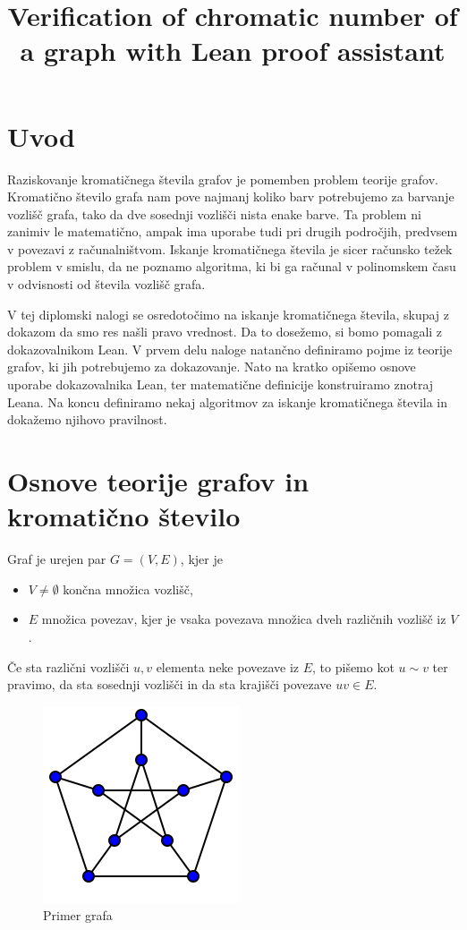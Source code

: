 \documentclass[mat1]{fmfdelo}
\title{Verification of chromatic number of a graph with Lean proof assistant}
\begin{document}
\section{Uvod}
Raziskovanje kromatičnega števila grafov je pomemben problem teorije grafov.
Kromatično število grafa nam pove najmanj koliko barv potrebujemo za barvanje vozlišč grafa, tako da dve sosednji vozlišči nista enake barve.
Ta problem ni zanimiv le matematično, ampak ima uporabe tudi pri drugih področjih, predvsem v povezavi z računalništvom. 
Iskanje kromatičnega števila je sicer računsko težek problem v smislu, da ne poznamo algoritma, ki bi ga računal v polinomskem času v odvisnosti od števila vozlišč grafa.

V tej diplomski nalogi se osredotočimo na iskanje kromatičnega števila, skupaj z dokazom da smo res našli pravo vrednost.
Da to dosežemo, si bomo pomagali z dokazovalnikom Lean.
V prvem delu naloge natančno definiramo pojme iz teorije grafov, ki jih potrebujemo za dokazovanje. Nato na kratko opišemo osnove uporabe dokazovalnika
Lean, ter matematične definicije konstruiramo znotraj Leana. 
Na koncu definiramo nekaj algoritmov za iskanje kromatičnega števila in dokažemo njihovo pravilnost. 


\section{Osnove teorije grafov in kromatično število}

\begin{definicija}
    Graf je urejen par $G=(V, E)$, kjer je 
    \begin{itemize}
      \item $V\neq \emptyset$ končna množica vozlišč,
      \item $E$ množica povezav, kjer je vsaka povezava množica dveh različnih vozlišč iz $V$. 
    \end{itemize}
\end{definicija}
Če sta različni vozlišči $u, v$ elementa neke povezave iz $E$, to pišemo kot $u\sim v$ ter pravimo, da sta sosednji vozlišči in da sta krajišči povezave $uv\in E$.

\begin{figure}[H]
\begin{center}
\includegraphics[scale=1]{assets/graph}
\caption{Primer grafa}
\label{slika2}
\end{center}
\end{figure}
\end{document}
